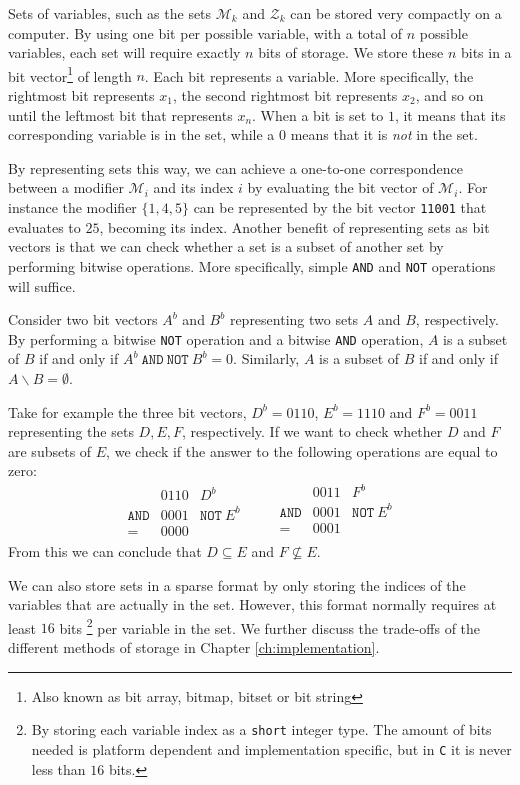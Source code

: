 Sets of variables, such as the sets $\mathcal{M}_k$ and $\mathcal{Z}_k$ can be
stored very compactly on a computer.
By using one bit per possible variable, with a total of $n$ possible variables,
each set will require exactly $n$ bits of storage.
We store these $n$ bits in a bit vector\footnote{Also known as bit array,
bitmap, bitset or bit string} of length $n$.
Each bit represents a variable. More specifically, the rightmost bit represents
$x_1$, the second rightmost bit represents $x_2$, and so on until the leftmost
bit that represents $x_n$.
When a bit is set to $1$, it means that its corresponding variable is in
the set, while a $0$ means that it is \emph{not} in the set.

By representing sets this way, we can achieve a one-to-one correspondence
between a modifier $\mathcal{M}_i$ and its index $i$ by evaluating the bit
vector of $\mathcal{M}_i$. For instance the modifier $\{ {1,4,5} \}$ can be
represented by the bit vector \texttt{11001} that evaluates to $25$, becoming
its index. Another benefit of representing sets as bit vectors is
that we can check whether a set is a
subset of another set by performing bitwise operations. More specifically,
simple \texttt{AND} and \texttt{NOT} operations will suffice.

Consider two bit vectors $A^b$ and $B^b$ representing two sets $A$ and
$B$, respectively.
By performing a bitwise \texttt{NOT} operation and a bitwise \texttt{AND}
operation, $A$ is a subset of $B$ if and only if
$A^b~\texttt{AND}~\texttt{NOT}~B^b = 0$.
Similarly, $A$ is a subset of $B$ if and only if $A \backslash B = \emptyset$.

Take for example the three bit vectors, $D^b = 0110$, $E^b = 1110$ and
$F^b = 0011$ representing the sets $D, E, F$, respectively.
If we want to check whether $D$ and $F$ are subsets of $E$, we check if the
answer to the following operations are equal to zero:
\[
\begin{array}{lrl}
                 & 0110 & D^b \\
    \texttt{AND} & 0001 & \texttt{NOT}~E^b \\ \hline
    =            & 0000
\end{array}
\qquad
\begin{array}{lrl}
                 & 0011 & F^b \\
    \texttt{AND} & 0001 & \texttt{NOT}~E^b \\ \hline
    =            & 0001 \\
\end{array}
\]
From this we can conclude that $D \subseteq E$ and $F \not\subseteq E$.

We can also store sets in a sparse
format by only storing the indices of the variables that are actually in the
set.
However, this format normally requires at least $16$ bits\nolinebreak
\footnote{By storing each variable index as a \texttt{short} integer type.
The amount of bits needed is platform dependent and implementation specific,
but in \texttt{C} it is never less than $16$ bits.}
per variable in the set.
We further discuss the trade-offs of the different methods of storage in
Chapter \ref{ch:implementation}.
